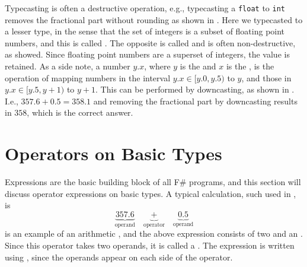 \documentclass[fsharpNotes.tex]{subfiles}
\begin{document}
Typecasting is often a destructive operation, e.g., typecasting a \lstinline!float! to \lstinline{int} removes the fractional part without rounding as shown in .
%
%
Here we typecasted to a lesser type, in the sense that the set of integers is a subset of floating point numbers, and this is called . The opposite is called  and is often non-destructive, as  showed. Since floating point numbers are a superset of integers, the value is retained. As a side note,  a number $y.x$, where $y$ is the  and $x$ is the , is the operation of mapping numbers in the interval $y.x \in [y.0,y.5)$ to $y$, and those in $y.x\in [y.5,y+1)$ to $y+1$. This can be performed by downcasting, as shown in .
%
%
I.e., $357.6+0.5=358.1$ and removing the fractional part by downcasting results in $358$, which is the correct answer.

\section{Operators on Basic Types}
Expressions are the basic building block of all F\# programs, and this section will discuss operator expressions on basic types. 
A typical calculation, such used in , is \begin{equation}
  \underbrace{357.6}_{\text{operand}}\quad\underbrace{+}_{\text{operator}}\quad\underbrace{0.5}_{\text{operand}}
\end{equation}
is an example of an arithmetic , and the above expression consists of two  and an . Since this operator takes two operands, it is called a . The expression is written using , since the operands appear on each side of the operator.
\end{document}
